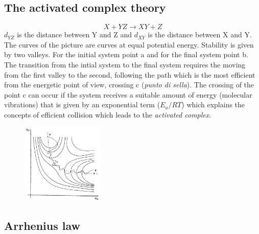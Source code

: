 \documentclass[12pt]{article}
\begin{document}
\subsection{The activated complex theory}

\begin{equation}
    X+YZ \rightarrow XY+Z
\end{equation}
$d_{YZ}$ is the distance between Y and Z and $d_{XY}$ is the distance between X and Y. The curves of the picture are curves at equal potential energy. Stability is given by two valleys. For the initial system point a and for the final system point b.
The transition from the intial system to the final system requires the moving from the first valley to the second, following the path which is the most efficient from the energetic point of view, crossing c (\textit{punto di sella}). The crossing of the point c can occur if the system receives a suitable amount of energy (molecular vibrations) that is given by an exponential term ($E_{a}/RT$) which explains the concepts of efficient collision which leads to the \textit{activated complex}.

\begin{figure}[h!]
\centering
\includegraphics[width=0.35\textwidth]{figures/pointc.png}
\end{figure}



\subsection{Arrhenius law}
\end{document}
